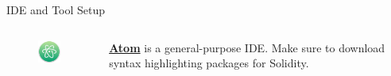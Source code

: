 \documentclass[]{beamer}
\begin{document}
\begin{frame}{IDE and Tool Setup}
	\begin{columns}
	\begin{column}{0.1\textwidth}
			\begin{figure}
				\includegraphics[width = \textwidth]{../assets/images/logo_atom.png}
			\end{figure}
		\end{column}
		\begin{column}{0.85\textwidth}
			\textbf{\href{https://atom.io/}{\link Atom}} is a general-purpose IDE. Make sure to download syntax highlighting packages for Solidity.
		\end{column}
	\end{columns}
	
	\vspace{1em}
	
\end{frame}
\end{document}
